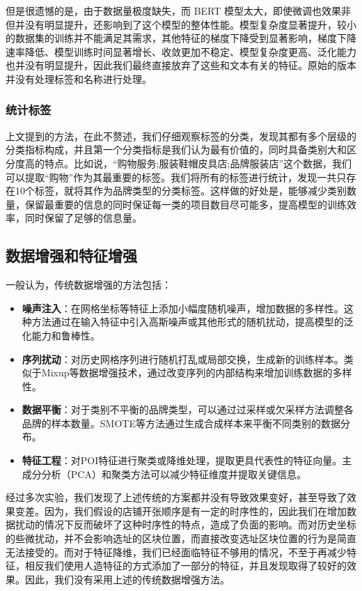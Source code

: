 \documentclass{article}
\begin{document}
但是很遗憾的是，由于数据量极度缺失，而 BERT 模型太大，即使微调也效果非但并没有明显提升，还影响到了这个模型的整体性能。模型复杂度显著提升，较小的数据集的训练并不能满足其需求，其他特征的梯度下降受到显著影响，梯度下降速率降低、模型训练时间显著增长、收敛更加不稳定、模型复杂度更高、泛化能力也并没有明显提升，因此我们最终直接放弃了这些和文本有关的特征。原始的版本并没有处理标签和名称进行处理。

\subsubsection{统计标签}

上文提到的方法，在此不赘述，我们仔细观察标签的分类，发现其都有多个层级的分类指标构成，并且第一个分类指标是我们认为最有价值的，同时具备类别大和区分度高的特点。比如说，“购物服务;服装鞋帽皮具店;品牌服装店”这个数据，我们可以提取“购物”作为其最重要的标签。我们将所有的标签进行统计，发现一共只存在10个标签，就将其作为品牌类型的分类标签。这样做的好处是，能够减少类别数量，保留最重要的信息的同时保证每一类的项目数目尽可能多，提高模型的训练效率，同时保留了足够的信息量。

\subsection{数据增强和特征增强}

一般认为，传统数据增强的方法包括：

\begin{itemize}
\item \textbf{噪声注入}：在网格坐标等特征上添加小幅度随机噪声，增加数据的多样性\cite{bishop_training_1995}。这种方法通过在输入特征中引入高斯噪声或其他形式的随机扰动，提高模型的泛化能力和鲁棒性。
\item \textbf{序列扰动}：对历史网格序列进行随机打乱或局部交换，生成新的训练样本\cite{zhang_mixup_2018}。类似于Mixup等数据增强技术，通过改变序列的内部结构来增加训练数据的多样性。
\item \textbf{数据平衡}：对于类别不平衡的品牌类型，可以通过过采样或欠采样方法调整各品牌的样本数量\cite{chawla_smote_2002}。SMOTE等方法通过生成合成样本来平衡不同类别的数据分布。
\item \textbf{特征工程}：对POI特征进行聚类或降维处理，提取更具代表性的特征向量\cite{jolliffe_principal_2016}。主成分分析（PCA）和聚类方法可以减少特征维度并提取关键信息。
\end{itemize}

经过多次实验，我们发现了上述传统的方案都并没有导致效果变好，甚至导致了效果变差。因为，我们假设的店铺开张顺序是有一定的时序性的，因此我们在增加数据扰动的情况下反而破坏了这种时序性的特点，造成了负面的影响。而对历史坐标的些微扰动，并不会影响选址的区块位置，而直接改变选址区块位置的行为是简直无法接受的。而对于特征降维，我们已经面临特征不够用的情况，不至于再减少特征，相反我们使用人造特征的方式添加了一部分的特征，并且发现取得了较好的效果。因此，我们没有采用上述的传统数据增强方法。
\end{document}

